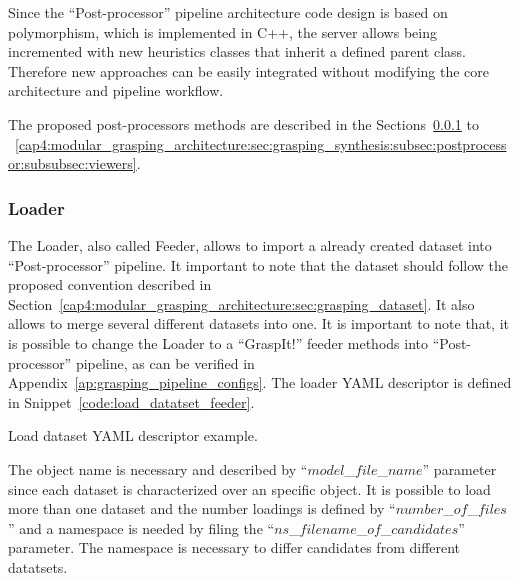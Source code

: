 Since the ``Post-processor'' pipeline architecture code design is based on polymorphism, which is implemented in C++, the server allows being incremented with new heuristics classes that inherit a defined parent class. Therefore new approaches can be easily integrated without modifying the core architecture and pipeline workflow. 

The proposed post-processors methods are described in the Sections~\ref{cap4:modular_grasping_architecture:sec:grasping_synthesis:subsec:graspit:subsubsec:loader} to ~\ref{cap4:modular_grasping_architecture:sec:grasping_synthesis:subsec:postprocessor:subsubsec:viewers}.

\subsubsection{Loader}
\label{cap4:modular_grasping_architecture:sec:grasping_synthesis:subsec:graspit:subsubsec:loader}

The Loader, also called Feeder, allows to import a already created dataset into ``Post-processor'' pipeline. It important to note that the dataset should follow the proposed convention described in Section~\ref{cap4:modular_grasping_architecture:sec:grasping_dataset}. It also allows to merge several different datasets into one. It is important to note that, it is possible to change the Loader to a ``GraspIt!'' feeder methods into ``Post-processor'' pipeline, as can be verified in Appendix~\ref{ap:grasping_pipeline_configs}. The loader YAML descriptor is defined in Snippet~\ref{code:load_datatset_feeder}. %

\begin{snippet}[h!]
\centering
{}
\caption{Load dataset YAML descriptor example.}
\label{code:load_datatset_feeder}
\end{snippet}

The object name is necessary and described by ``$model$\_$file$\_$name$'' parameter since each dataset is characterized over an specific object. It is possible to load more than one dataset and the number loadings is defined by ``$number$\_$of$\_$files$'' and a namespace is needed by filing the ``$ns$\_$filename$\_$of$\_$candidates$'' parameter. The namespace is necessary to differ candidates from different datatsets. 


